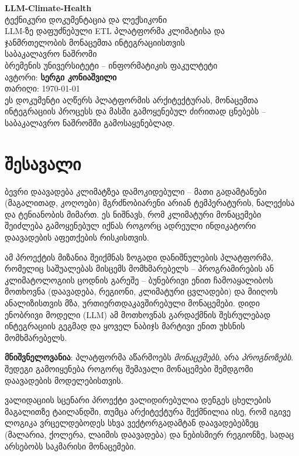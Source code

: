 \documentclass[11pt,a4paper]{article}
\begin{document}
\begin{titlepage}
\centering
\vspace*{3cm}
{\Huge\bfseries\color{brandgreen} LLM-Climate-Health}\\[0.5cm]
{\Large ტექნიკური დოკუმენტაცია და ლექსიკონი}\\[2cm]
{\large LLM-ზე დაფუძნებული ETL პლატფორმა კლიმატისა და\\ ჯანმრთელობის მონაცემთა ინტეგრაციისთვის}\\[2cm]
{\large საბაკალავრო ნაშრომი}\\[0.3cm]
{\large ბრემენის უნივერსიტეტი -- ინფორმატიკის ფაკულტეტი}\\[2cm]
{\large ავტორი: \textbf{სერგი კონიაშვილი}}\\[0.5cm]
{\large თარიღი: \today}\\[3cm]
{\normalsize ეს დოკუმენტი აღწერს პლატფორმის არქიტექტურას, მონაცემთა\\
ინტეგრაციის პროცესს და მასში გამოყენებულ ძირითად ცნებებს --\\
საბაკალავრო ნაშრომში გამოსაყენებლად.}
\vfill
\end{titlepage}

\tableofcontents
\newpage

\section{შესავალი}

ბევრი დაავადება კლიმატზეა დამოკიდებული -- მათი გადამტანები (მაგალითად,
კოღოები) მგრძნობიარენი არიან ტემპერატურის, ნალექისა და ტენიანობის მიმართ.
ეს ნიშნავს, რომ კლიმატური მონაცემები შეიძლება გამოყენებულ იქნას როგორც
ადრეული ინდიკატორი დაავადების აფეთქების რისკისთვის.

ამ პროექტის მიზანია შეიქმნას ზოგადი დანიშნულების პლატფორმა, რომელიც
საშუალებას მისცემს მომხმარებელს -- პროგრამირების ან კლიმატოლოგიის
ცოდნის გარეშე -- ბუნებრივი ენით ჩამოაყალიბოს მოთხოვნა (დაავადება,
რეგიონი, კლიმატური ცვლადები) და მიიღოს ანალიზისთვის მზა, ურთიერთდაკავშირებული
მონაცემები. დიდი ენობრივი მოდელი (LLM) ამ მოთხოვნას გარდაქმნის
შესრულებად ინტეგრაციის გეგმად და ყოველ ნაბიჯს მარტივი ენით უხსნის
მომხმარებელს.

\textbf{მნიშვნელოვანია}: პლატფორმა აწარმოებს \emph{მონაცემებს}, არა
\emph{პროგნოზებს}. შედეგი გამოიყენება როგორც შემავალი მონაცემები
შემდგომი დაავადების მოდელებისთვის.

\begin{infobox}{ვალიდაციის სცენარი}
პროექტი ვალიდირებულია დენგეს ცხელების მაგალითზე ტაილანდში, თუმცა
არქიტექტურა შექმნილია ისე, რომ იგივე ლოგიკა ვრცელდებოდეს სხვა
ვექტორგადამტან დაავადებებზეც (მალარია, ქოლერა, ლაიმის დაავადება) და
ნებისმიერ რეგიონზე, სადაც არსებობს საკმარისი მონაცემები.
\end{infobox}
\end{document}
